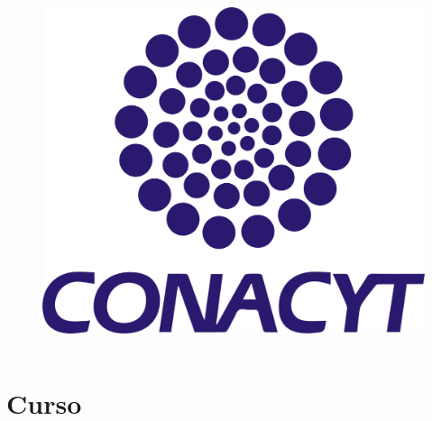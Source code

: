 \documentclass[10pt]{beamer}
\begin{document}
\begin{frame}
\begin{columns}[T]
\vspace{-3mm}		
	\begin{column}{.25\textwidth}	
	\begin{figure}
	\includegraphics[scale=0.2]{./Figures/conacyt.png}
	\end{figure}
	\end{column}
	
\end{columns} 
  
  \titlepage   
\end{frame}




\section{Curso}
\end{document}
